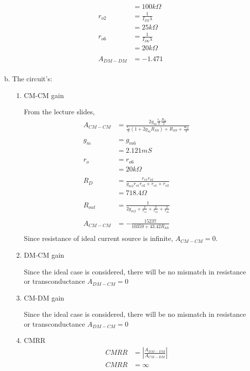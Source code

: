 \documentclass{article}
\begin{document}
\begin{enumerate}[(a)]
\begin{equation*}
\begin{aligned}
&= 100 k\Omega \\
r_{o2} &= \frac{1}{I_{D2}\lambda} \\
&= 25 k\Omega \\
r_{o6} &= \frac{1}{I_{D6}\lambda} \\
&= 20 k\Omega \\
\\
A_{DM-DM} &= -1.471 \\
\end{aligned}
\end{equation*}
\item The circuit's:
\begin{enumerate}[1.]
\item CM-CM gain

From the lecture slides,
\begin{equation*}
\begin{aligned}
A_{CM-CM} &= \frac{2g_{m}\frac{r_{o}}{2}\frac{R_{D}}{2}}{\frac{r_{o}}{2}(1 + 2g_{m}R_{SS}) + R_{SS}+\frac{R_{D}}{2}} \\
\\
g_{m} &= g_{m6} \\
&= 2.121mS \\
\\
r_{o} &= r_{o6} \\
&= 20k\Omega \\
\\
R_{D} &= \frac{r_{o1}r_{o2}}{g_{m2}r_{o1}r_{o2} + r_{o1} + r_{o2}} \\
&= 718.4\Omega \\
\\
R_{out} &= \frac{1}{2g_{m2} + \frac{2}{r_{o1}} + \frac{2}{r_{o2}} + \frac{2}{r_{o6}}} \\
\\
A_{CM-CM} &= -\frac{15237}{10359 + 43.42R_{SS}} \\
\end{aligned}
\end{equation*}
Since resistance of ideal current source is infinite, \(A_{CM-CM} = 0\).
\item DM-CM gain

Since the ideal case is considered, there will be no mismatch in resistance or transconductance
\(A_{DM-CM} = 0\)
\item CM-DM gain

Since the ideal case is considered, there will be no mismatch in resistance or transconductance
\(A_{DM-CM} = 0\)

\item CMRR
\begin{equation*}
\begin{aligned}
CMRR &= |\frac{A_{DM-DM}}{A_{CM-DM}}| \\
CMRR &= \infty
\end{aligned}
\end{equation*}
\end{enumerate}


\end{enumerate}
\end{document}
